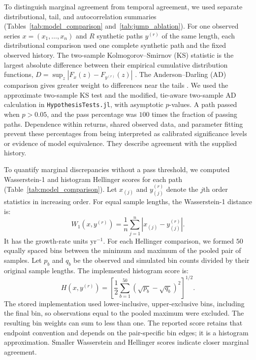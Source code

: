 To distinguish marginal agreement from temporal agreement, we used
separate distributional, tail, and autocorrelation summaries
(Tables~\ref{tab:model_comparison} and~\ref{tab:jump_ablation}).
For one observed series $x=(x_1,\ldots,x_n)$ and $R$ synthetic
paths $y^{(r)}$ of the same length, each distributional comparison
used one complete synthetic path and the fixed observed history.
The two-sample Kolmogorov--Smirnov (KS) statistic is the largest
absolute difference between their empirical cumulative distribution
functions, $D=\sup_z|F_x(z)-F_{y^{(r)}}(z)|$
\cite{kolmogorov1933,smirnov1948}. The Anderson--Darling (AD)
comparison gives greater weight to differences near the tails
\cite{andersonDarling1952}. We used the approximate two-sample KS
test and the modified, tie-aware two-sample AD calculation in
\texttt{HypothesisTests.jl}, with asymptotic $p$-values. A path
passed when $p>0.05$, and the pass percentage was $100$ times the
fraction of passing paths. Dependence within returns, shared observed
data, and parameter fitting prevent these percentages from being
interpreted as calibrated significance levels or evidence of model
equivalence. They describe agreement with the supplied history.

To quantify marginal discrepancies without a pass threshold, we
computed Wasserstein-1 and histogram Hellinger scores for each path
(Table~\ref{tab:model_comparison}). Let $x_{(j)}$ and $y^{(r)}_{(j)}$
denote the $j$th order statistics in increasing order. For equal
sample lengths, the Wasserstein-1 distance is:
\begin{equation}
 W_1(x,y^{(r)})=\frac{1}{n}\sum_{j=1}^{n}
       |x_{(j)}-y^{(r)}_{(j)}|.
 \label{eq:wasserstein}
\end{equation}
It has the growth-rate units $\mathrm{yr}^{-1}$. For each Hellinger
comparison, we formed $50$ equally spaced bins between the minimum
and maximum of the pooled pair of samples. Let $p_b$ and $q_b$ be
the observed and simulated bin counts divided by their original
sample lengths. The implemented histogram score is:
\begin{equation}
 H(x,y^{(r)})=\left[\frac{1}{2}\sum_{b=1}^{50}
          (\sqrt{p_b}-\sqrt{q_b})^2\right]^{1/2}.
 \label{eq:hellinger}
\end{equation}
The stored implementation used lower-inclusive, upper-exclusive
bins, including the final bin, so observations equal to the pooled
maximum were excluded. The resulting bin weights can sum to less
than one. The reported score retains that endpoint convention and
depends on the pair-specific bin edges; it is a histogram
approximation. Smaller Wasserstein and Hellinger scores indicate
closer marginal agreement.

